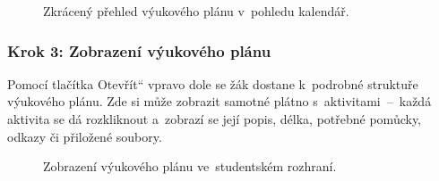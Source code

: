 \documentclass[male,czech,api_bc]{kitheses}
\begin{document}
\begin{figure}[H]
	\centering
	\caption{Zkrácený přehled výukového plánu v~pohledu kalendář.}
	\label{fig:manual-10}
\end{figure}

\subsubsection{Krok 3: Zobrazení výukového plánu}
Pomocí tlačítka \quotedblbase Otevřít`` vpravo dole se žák dostane k~podrobné struktuře výukového plánu. Zde si může zobrazit samotné plátno s~aktivitami~--~každá aktivita se dá rozkliknout a~zobrazí se její popis, délka, potřebné pomůcky, odkazy či přiložené soubory.

\begin{figure}[H]
	\centering
	\caption{Zobrazení výukového plánu ve~studentském rozhraní.}
	\label{fig:manual-11}
\end{figure}
\end{document}
